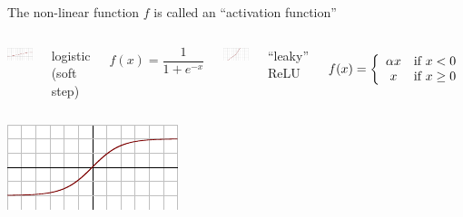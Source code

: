 \documentclass[aspectratio=169]{beamer}
\begin{document}
\begin{frame}{The non-linear function $f$ is called an ``activation function''}
\vspace{0.5cm}
\begin{columns}
\includegraphics[width=\linewidth]{Activation_logistic.pdf}

logistic (soft step)

\vspace{-\baselineskip}
\[ f(x) = \frac{1}{1 + e^{-x}} \]

\includegraphics[width=\linewidth]{Activation_prelu.pdf}


``leaky'' ReLU

\vspace{-\baselineskip}
\[ f(x) = \left\{ \begin{array}{c l}
\alpha x & \text{if } x < 0 \\
x & \text{if } x \ge 0 \\
\end{array} \right. \]
\end{columns}

\vspace{0.5cm}
\begin{columns}
\includegraphics[width=\linewidth]{Activation_tanh.pdf}


\end{columns}
\end{frame}
\end{document}
